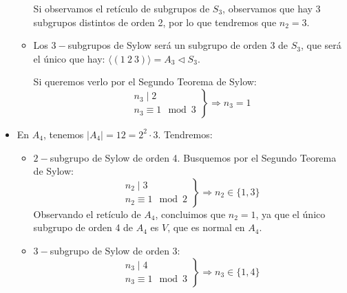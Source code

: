 \begin{ejemplo}
\begin{itemize}
\begin{itemize}
                    Si observamos el retículo de subgrupos de $S_3$, observamos que hay 3 subgrupos distintos de orden 2, por lo que tendremos que $n_2 = 3$.

                \item Los $3-$subgrupos de Sylow será un subgrupo de orden 3 de $S_3$, que será el único que hay: $\langle (1\ 2\ 3) \rangle  = A_3 \lhd S_3$. 

                    Si queremos verlo por el Segundo Teorema de Sylow:
                    \begin{equation*}
                        \left.\begin{array}{r}
                            n_3 \mid 2 \\
                            n_3 \equiv 1 \mod 3
                    \end{array}\right\} \Longrightarrow n_3 = 1
                    \end{equation*}
                \end{itemize}
                \item En $A_4$, tenemos $|A_4| = 12 = 2^2 \cdot 3$. Tendremos:
                    \begin{itemize}
                        \item $2-$subgrupo de Sylow de orden 4. Busquemos por el Segundo Teorema de Sylow:
                            \begin{equation*}
                                \left.\begin{array}{r}
                                    n_2 \mid 3 \\
                                    n_2 \equiv 1 \mod 2
                            \end{array}\right\} \Longrightarrow n_2 \in \{1,3\}
                            \end{equation*}
                            Observando el retículo de $A_4$, concluimos que $n_2 = 1$, ya que el único subgrupo de orden 4 de $A_4$ es $V$, que es normal en $A_4$.
                        \item $3-$subgrupo de Sylow de orden 3:
                            \begin{equation*}
                                \left.\begin{array}{r}
                                    n_3 \mid 4 \\
                                    n_3 \equiv 1 \mod 3
                                \end{array}\right\} \Longrightarrow n_3 \in \{1,4\} 

\end{equation*}
\end{itemize}
\end{itemize}
\end{ejemplo}
